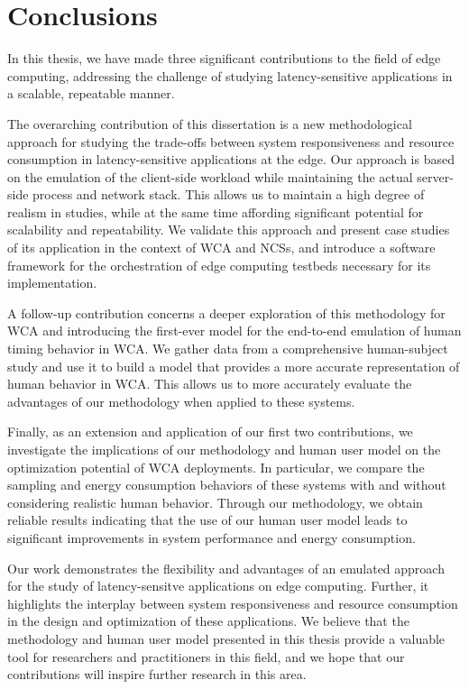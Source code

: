 \section{Conclusions}

In this thesis, we have made three significant contributions to the field of edge computing, addressing the challenge of studying latency-sensitive applications in a scalable, repeatable manner.

The overarching contribution of this dissertation is a new methodological approach for studying the trade-offs between system responsiveness and resource consumption in latency-sensitive applications at the edge.
Our approach is based on the emulation of the client-side workload while maintaining the actual server-side process and network stack.
This allows us to maintain a high degree of realism in studies, while at the same time affording significant potential for scalability and repeatability.
We validate this approach and present case studies of its application in the context of \gls{WCA} and \glspl{NCS}, and introduce a software framework for the orchestration of edge computing testbeds necessary for its implementation.

A follow-up contribution concerns a deeper exploration of this methodology for \gls{WCA} and introducing the first-ever model for the end-to-end emulation of human timing behavior in \gls{WCA}.
We gather data from a comprehensive human-subject study and use it to build a model that provides a more accurate representation of human behavior in \gls{WCA}.
This allows us to more accurately evaluate the advantages of our methodology when applied to these systems.

Finally, as an extension and application of our first two contributions, we investigate the implications of our methodology and human user model on the optimization potential of \gls{WCA} deployments.
In particular, we compare the sampling and energy consumption behaviors of these systems with and without considering realistic human behavior.
Through our methodology, we obtain reliable results indicating that the use of our human user model leads to significant improvements in system performance and energy consumption.

Our work demonstrates the flexibility and advantages of an emulated approach for the study of latency-sensitve applications on edge computing.
Further, it highlights the interplay between system responsiveness and resource consumption in the design and optimization of these applications.
We believe that the methodology and human user model presented in this thesis provide a valuable tool for researchers and practitioners in this field, and we hope that our contributions will inspire further research in this area.

